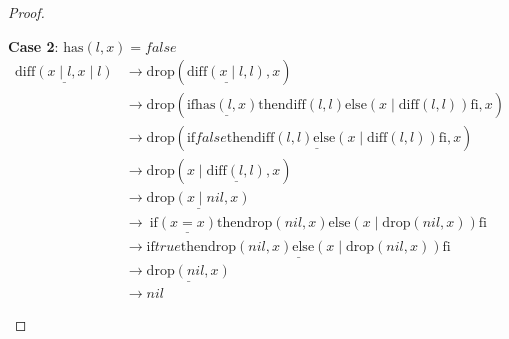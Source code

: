 \documentclass[12pt, a4paper]{article}
\newcommand{\rel}[1]{\mathrel{#1}}
\newcommand{\rmx}[1]{\mathrm{#1}}
\newcommand{\larrow}{\longrightarrow}
\newcommand{\under}{\underline}
\begin{document}
\begin{proof}
\begin{description}
\textbf{Case 2}: $\rmx{has}(l, x) = false$
\begin{align*}
\under{\rmx{diff}(x \mid l, x \mid l)}
	&\larrow \rmx{drop}(\under{\rmx{diff}(x \mid l, l)}, x) \tag{by Problem 14} \\
	&\larrow \rmx{drop}(\rel{\rmx{if}} \under{\rmx{has}(l, x)} \rel{\rmx{then}} \rmx{diff}(l, l) \rel{\rmx{else}} (x \mid \rmx{diff}(l, l)) \rel{\rmx{fi}}, x) \tag{by diff2} \\
	&\larrow \rmx{drop}(\under{\rel{\rmx{if}} false \rel{\rmx{then}} \rmx{diff}(l, l) \rel{\rmx{else}} (x \mid \rmx{diff}(l, l)) \rel{\rmx{fi}}}, x) \tag{by case splitting} \\
	&\larrow \rmx{drop}(x \mid \under{\rmx{diff}(l, l)}, x) \tag{by if2} \\
	&\larrow \under{\rmx{drop}(x \mid nil, x)} \tag{by IH} \\
	&\larrow\ \rel{\rmx{if}} \under{(x = x)} \rel{\rmx{then}} \rmx{drop}(nil, x) \rel{\rmx{else}} (x \mid \rmx{drop}(nil, x)) \rel{\rmx{fi}} \tag{by drop2} \\
	&\larrow \under{\rel{\rmx{if}} true \rel{\rmx{then}} \rmx{drop}(nil, x) \rel{\rmx{else}} (x \mid \rmx{drop}(nil, x)) \rel{\rmx{fi}}} \tag{by equality} \\
	&\larrow \under{\rmx{drop}(nil, x)} \tag{by if1} \\
	&\larrow nil \tag{by drop1}
\end{align*}
\end{description}

\end{proof}
\end{document}
